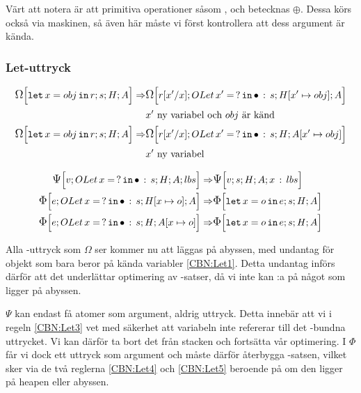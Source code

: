 \documentclass[../Optimise]{subfiles}
\begin{document}
Värt att notera är att primitiva operationer såsom \ic{+\#}, \ic{*\#} och \ic{==\#} betecknas $\oplus$. 
Dessa körs också via maskinen, så även här måste vi först kontrollera att dess argument
är kända.

\subsubsection{Let-uttryck}
\begin{align}
\label{CBN:Let1} \CBNOMEGA sHA{\eLet x{obj}r} \Rightarrow & \CBNOMEGA {\cOLet{x'}s}{\heap{x'}{obj}}A{\subst r{x'}x}\\
   & x'\mbox{ ny variabel och } obj \text{ är känd}\nonumber \\
\label{CBN:Let2} \CBNOMEGA sHA{\eLet x{obj}r} \Rightarrow & \CBNOMEGA{\cOLet{x'}s}H{\abyss{x'}{obj}}{\subst r{x'}x}\\
   & x'\mbox{ ny variabel} \nonumber 
\end{align}

\begin{align}
\label{CBN:Let3} \CBNPSI{\cOLet xs}H A{lbs}v \Rightarrow & \CBNPSI sHA{x\,:\, lbs}v \\
\label{CBN:Let4} \CBNIRR{\cOLet xs}{\heap xo}Ae \Rightarrow & \CBNIRR sHA{\eLet xoe} \\
\label{CBN:Let5} \CBNIRR{\cOLet xs}H{\abyss xo}e \Rightarrow & \CBNIRR sHA{\eLet xoe}
\end{align}



Alla -uttryck som $\Omega$ ser kommer nu att läggas på abyssen, 
med undantag för objekt som bara beror på kända variabler \eqref{CBN:Let1}. 
Detta undantag införs därför att det underlättar optimering av -satser, 
då vi inte kan :a på något som ligger på abyssen.

$\Psi$ kan endast få atomer som argument, aldrig uttryck. Detta innebär att vi 
i regeln \eqref{CBN:Let3} vet med säkerhet att variabeln inte refererar till det 
-bundna uttrycket. Vi kan därför ta bort det från stacken och fortsätta 
vår optimering. I $\Phi$ får vi dock ett uttryck som argument och måste därför 
återbygga -satsen, vilket sker via de två reglerna \eqref{CBN:Let4} och 
\eqref{CBN:Let5} beroende på om den ligger på heapen eller abyssen.
\end{document}
